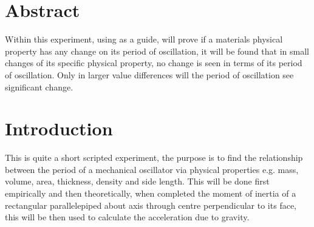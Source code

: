 \documentclass[12pt]{article}
\begin{document}

\newpage
\begin{titlepage}
\begin{tableofcontents}

\end{tableofcontents}
\end{titlepage}


\section{Abstract}
\label{Abstract Section}

Within this experiment, using \cite{LLR.3-2018} as a guide, will prove if a materials physical property has any change on its period of oscillation, it will be found that in small changes of its specific physical property, no change is seen in terms of its period of oscillation. Only in larger value differences will the period of oscillation see significant change. 


\section{Introduction}
\label{Introduction Section}

This is quite a short scripted experiment, the purpose is to find the relationship between the period of a mechanical oscillator via physical properties e.g. mass, volume, area, thickness, density and side length. This will be done first empirically and then theoretically, when completed the moment of inertia of a rectangular parallelepiped about axis through centre perpendicular to its face, this will be then used to calculate the acceleration due to gravity.
\end{document}
